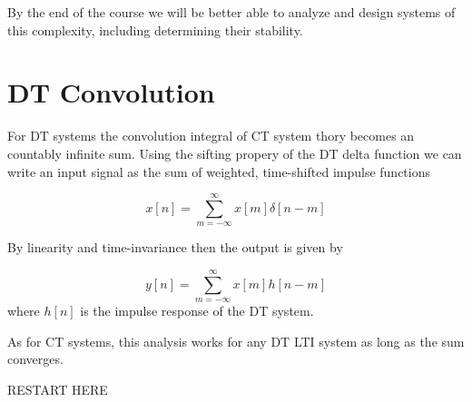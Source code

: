 \documentclass{article}
\begin{document}
By the end of the course we will be better able to analyze and design systems of this complexity, including determining their stability.

\section{DT Convolution}

For DT systems the convolution integral of CT system thory becomes an countably infinite sum. Using the sifting propery of the DT delta function we can write an input signal as the sum of weighted, time-shifted impulse functions

\begin{equation}
  x[n] = \sum\limits_{m = -\infty}^{\infty} x[m]\delta[n-m]
\end{equation}

By linearity and time-invariance then the output is given by

\begin{equation}
y[n] = \sum\limits_{m = -\infty}^{\infty} x[m]h[n-m]
\end{equation}
where $h[n]$ is the impulse response of the DT system.

As for CT systems, this analysis works for any DT LTI system as long as the sum converges.

RESTART HERE
\end{document}
